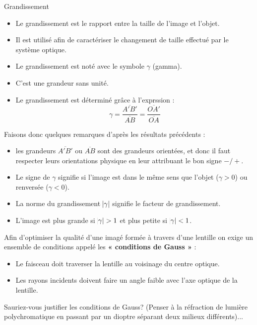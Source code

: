 \documentclass[11pt,a4paper]{article}
\begin{document}
\begin{defn}{Grandissement}
\begin{itemize}
    \item Le grandissement est le rapport entre la taille de l’image et l’objet.
    \item Il est utilisé afin de caractériser le changement de taille effectué par le système optique. 
    \item Le grandissement est noté avec le symbole $\gamma$ (gamma). 
    \item C'est une grandeur sans unité. 
    \item Le grandissement est déterminé grâce à l'exprssion : 
    \[ \gamma = \dfrac{\overline{A'B'}}{\overline{AB}} = \dfrac{\overline{OA'}}{\overline{OA}}     \]
\end{itemize}
\end{defn}

Faisons donc quelques remarques d'après les résultats précédents : 
\begin{itemize}
    \item les grandeurs $\overline{A'B'}$ ou $\overline{AB}$ sont des grandeurs orientées, et donc il faut respecter leurs orientations physique en leur attribuant le bon signe $-/+$. 
    \item Le signe de $\gamma$ signifie si l'image est dans le même sens que l'objet ($\gamma>0$) ou renversée ($\gamma<0$).
    \item La norme du grandissement $ \abs{\gamma}$ signifie le facteur de grandissement. 
    \item L'image est plus grande si $ \abs{\gamma}>1 $ et plus petite si $ \abs{\gamma}<1$. 
\end{itemize}

\begin{rmrq}
Afin d’optimiser la qualité d’une imagé formée à travers d’une lentille on exige un ensemble de conditions appelé les \textbf{« conditions de Gauss »} :
\begin{itemize}
    \item Le faisceau doit traverser la lentille au voisinage du centre optique.
    \item Les rayons incidents doivent faire un angle faible avec l'axe optique de la lentille.
\end{itemize}
Sauriez-vous justifier les conditions de Gauss? (Penser à la réfraction de lumière polychromatique en passant par un dioptre séparant deux milieux différents)...
\end{rmrq}
\end{document}
